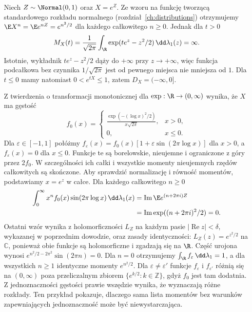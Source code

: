 \begin{przyklad}
Niech $Z\sim\Normal(0,1)$ oraz $X=e^Z$.
Ze wzoru na funkcję tworzącą standardowego rozkładu normalnego
(rozdział~\ref{ch:distributions})
otrzymujemy $\E X^n=\E e^{nZ}=e^{n^2/2}$ dla każdego
całkowitego $n\geq0$. Jednak dla $t>0$
\[
M_X(t)=\frac{1}{\sqrt{2\pi}}\int_\R
\exp(te^z-z^2/2)\,\dd\lambda_1(z)=\infty.
\]
Istotnie, wykładnik $te^z-z^2/2$ dąży do $+\infty$
przy $z\to+\infty$, więc funkcja podcałkowa bez czynnika
$1/\sqrt{2\pi}$ jest od pewnego miejsca nie mniejsza od $1$.
Dla $t\leq0$ mamy natomiast $0<e^{tX}\leq1$,
zatem $D_X=(-\infty,0]$.

Z twierdzenia o transformacji monotonicznej dla
$\exp:\R\to(0,\infty)$ wynika, że $X$ ma gęstość
\[
f_0(x)=
\begin{cases}
\displaystyle\frac{\exp(-(\log x)^2/2)}{x\sqrt{2\pi}},&x>0,\\
0,&x\leq0.
\end{cases}
\]
Dla $\varepsilon\in[-1,1]$ połóżmy
$f_\varepsilon(x)=f_0(x)[1+\varepsilon\sin(2\pi\log x)]$
dla $x>0$, a $f_\varepsilon(x)=0$ dla $x\leq0$.
Funkcje te są borelowskie, nieujemne i ograniczone
z góry przez $2f_0$. W szczególności ich całki i wszystkie
momenty nieujemnych rzędów całkowitych są skończone.
Aby sprawdzić normalizację i równość momentów, podstawiamy
$x=e^z$ w całce. Dla każdego całkowitego $n\geq0$
\[
\begin{aligned}
\int_0^\infty x^n f_0(x)\sin(2\pi\log x)\,
\dd\lambda_1(x)
&=\operatorname{Im}\E e^{(n+2\pi i)Z}\\
&=\operatorname{Im}\exp((n+2\pi i)^2/2)=0.
\end{aligned}
\]
Ostatni wzór wynika z holomorficzności $L_Z$ na
każdym pasie $|\operatorname{Re}z|<\delta$, wykazanej
w poprzednim dowodzie, oraz zasady identyczności:
$L_Z(z)=e^{z^2/2}$ na $\mathbb C$, ponieważ obie funkcje
są holomorficzne i zgadzają się na $\R$.
Część urojona wynosi $e^{n^2/2-2\pi^2}\sin(2\pi n)=0$.
Dla $n=0$ otrzymujemy $\int_\R f_\varepsilon\,\dd\lambda_1=1$,
a dla wszystkich $n\geq1$ identyczne momenty $e^{n^2/2}$.
Dla $\varepsilon\ne\varepsilon'$ funkcje
$f_\varepsilon$ i $f_{\varepsilon'}$ różnią się na
$(0,\infty)$ poza przeliczalnym zbiorem
$\{e^{k/2}:k\in\mathbb Z\}$, gdyż $f_0$ jest tam dodatnia.
Z jednoznaczności gęstości prawie wszędzie wynika,
że wyznaczają różne rozkłady. Ten przykład pokazuje, dlaczego sama lista momentów
bez warunków zapewniających jednoznaczność może być niewystarczająca.
\end{przyklad}

